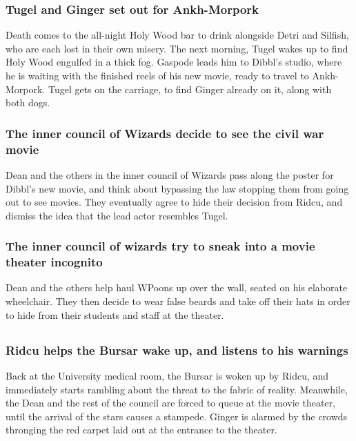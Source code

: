 \subsubsection{\Gls{Tugel} and \Gls{Ginger} set out for Ankh-Morpork}
\Gls{Death} comes to the all-night Holy Wood bar to drink alongside \Gls{Detri} and \Gls{Silfish},
who are each lost in their own misery. The next morning, \Gls{Tugel} wakes up to find Holy Wood
engulfed in a thick fog. \Gls{Gaspode} leads him to \Gls{Dibbl}'s studio, where he is waiting with
the finished reels of his new movie, ready to travel to Ankh-Morpork. \Gls{Tugel} gets on the
carriage, to find \Gls{Ginger} already on it, along with both dogs.

\subsubsection{The inner council of Wizards decide to see the civil war movie}
\Gls{Dean} and the others in the inner council of Wizards pass along the poster for \Gls{Dibbl}'s
new movie, and think about bypassing the law stopping them from going out to see movies. They
eventually agree to hide their decision from \Gls{Ridcu}, and dismiss the idea that the lead actor
resembles \Gls{Tugel}.

\subsubsection{The inner council of wizards try to sneak into a movie theater incognito}
\Gls{Dean} and the others help haul \Gls{WPoons} up over the wall, seated on his elaborate
wheelchair. They then decide to wear false beards and take off their hats in order to hide from
their students and staff at the theater.

\subsection{}
\subsubsection{\Gls{Ridcu} helps the \Gls{Bursar} wake up, and listens to his warnings}
Back at the University medical room, the \Gls{Bursar} is woken up by \Gls{Ridcu}, and immediately
starts rambling about the threat to the fabric of reality. Meanwhile, the \Gls{Dean} and the rest
of the council are forced to queue at the movie theater, until the arrival of the stars causes a
stampede. \Gls{Ginger} is alarmed by the crowds thronging the red carpet laid out at the entrance
to the theater.

